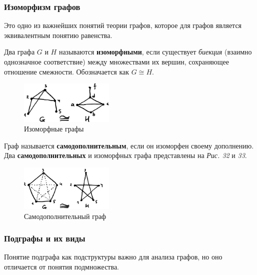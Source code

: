 \documentclass[12pt, a4paper]{article}
\begin{document}
\subsubsection{Изоморфизм графов}

Это одно из важнейших понятий теории графов, которое для графов является эквивалентным понятию равенства.

Два графа $G$ и $H$ называются \textbf{изоморфными}, если существует \textit{биекция} (взаимно однозначное соответствие) между множествами их вершин, сохраняющее отношение смежности. Обозначается как $G \cong H$.

\begin{figure}[h]
 \centering
 \includegraphics[width=0.4\textwidth]{33}
 \vspace{-4mm}
  \caption{Изоморфные графы}
\end{figure}

Граф называется \textbf{самодополнительным}, если он изоморфен своему дополнению. Два \textbf{самодополнительных} и изоморфных графа представлены на \textit{Рис. 32} и \textit{33}.

\begin{figure}[h]
 \centering
 \includegraphics[width=0.4\textwidth]{34}
 \vspace{-4mm}
  \caption{Самодополнительный граф}
\end{figure}

\subsubsection{Подграфы и их виды}

Понятие подграфа как подструктуры важно для анализа графов, но оно отличается от понятия подмножества.
\end{document}
